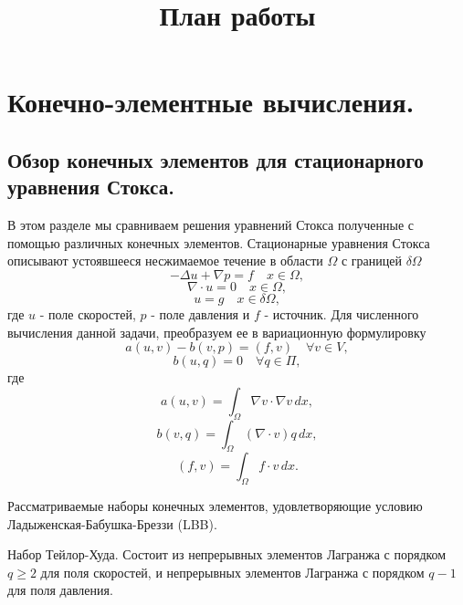 \documentclass[12pt]{article}
\title{План работы}
\date{}
\author{}
\begin{document}
\maketitle
\section{Конечно-элементные вычисления.}
\subsection{Обзор конечных элементов для стационарного уравнения Стокса.}
В этом разделе мы сравниваем решения уравнений Стокса полученные с помощью различных конечных элементов.
Стационарные уравнения Стокса описывают устоявшееся несжимаемое течение в области $\Omega$ с границей $\delta\Omega$
\begin{equation}
-\Delta u + \nabla p = f \quad x \in \Omega,
\end{equation}
\begin{equation}
\nabla\cdot u = 0 \quad x \in \Omega,
\end{equation}
\begin{equation} \label{eq:stokes-boundary}
u = g \quad x \in \delta\Omega,
\end{equation}
где $u$ - поле скоростей, $p$ - поле давления и $f$ - источник. Для численного вычисления данной задачи, преобразуем ее в вариационную формулировку
\begin{equation}
a(u,v)-b(v,p)=(f,v) \quad \forall v \in V,
\end{equation}
\begin{equation}
b(u,q)=0 \quad \forall q \in \Pi,
\end{equation}
где 
\begin{equation}
a(u,v)=\int_\Omega \nabla v \cdot \nabla v \, dx,
\end{equation}
\begin{equation}
b(v,q)=\int_\Omega (\nabla \cdot v) q \, dx,
\end{equation}
\begin{equation}
(f,v)=\int_\Omega f \cdot v \, dx.
\end{equation}

Рассматриваемые наборы конечных элементов, удовлетворяющие условию Ладыженская-Бабушка-Бреззи (LBB).

Набор Тейлор-Худа.
Состоит из непрерывных элементов Лагранжа с порядком $q \geq 2$ для поля скоростей, и непрерывных элементов Лагранжа с порядком $q - 1$ для поля давления.
\end{document}

